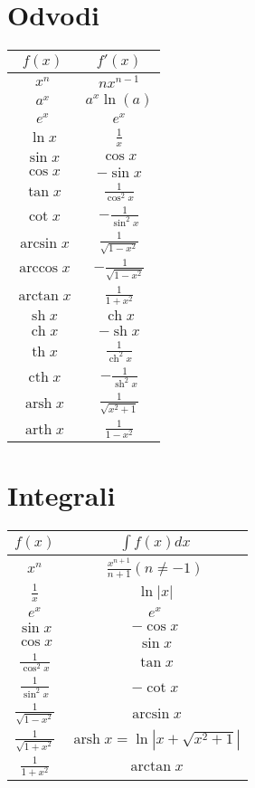 \documentclass[a4paper,oneside,10pt]{article}
\title{\Title}
\author{\Author}
\date{\today}
\theoremstyle{definition}
\DeclareMathOperator\ch{ch}
\DeclareMathOperator\sh{sh}
\DeclareMathOperator\Th{th}  %
\DeclareMathOperator\cth{cth}
\DeclareMathOperator\arsh{arsh}
\DeclareMathOperator\arth{arth}
\newcommand\abs[1]{\left|#1\right|}
\begin{document}
\begin{multicols}{2}
	\section*{Odvodi}
	\begin{tabular}[h]{|c|c|}
		\hline
		$f(x)$ & $f'(x)$ \\
		\hline
		$x^n$ & $nx^{n-1}$\\
		$a^x$ & $a^x\ln(a)$\\
		$e^x$ & $e^x$\\
		$\ln{x}$ & $\frac{1}{x}$\\
		$\sin{x}$ & $\cos{x}$\\
		$\cos{x}$ & $-\sin{x}$\\
		$\tan{x}$ & $\frac{1}{\cos^2{x}}$\\
		$\cot{x}$ & $-\frac{1}{\sin^2{x}}$\\
		$\arcsin{x}$ & $\frac{1}{\sqrt{1-x^2}}$\\
		$\arccos{x}$ & $-\frac{1}{\sqrt{1-x^2}}$\\
		$\arctan{x}$ & $\frac{1}{1+x^2}$\\
		$\sh{x}$ & $\ch{x}$\\
		$\ch{x}$ & $-\sh{x}$\\
		$\Th{x}$ & $\frac{1}{\ch^2{x}}$\\
		$\cth{x}$ & $-\frac{1}{\sh^2{x}}$\\
		$\arsh{x}$ & $\frac{1}{\sqrt{x^2+1}}$\\
		$\arth{x}$ & $\frac{1}{1-x^2}$\\
		\hline 

	\end{tabular}
%
	\section*{Integrali}
	\begin{tabular}[h]{|c|c|}
		\hline
		$f(x)$ & $\int f(x)dx$ \\
		\hline
		$x^n$ & $\frac{x^{n+1}}{n+1} (n \neq -1)$ \\
		$\frac{1}{x}$ & $\ln{\abs{x}}$ \\
		$e^x$ & $e^x$\\
		$\sin{x}$ & $-\cos{x}$\\
		$\cos{x}$ & $\sin{x}$\\
		$\frac{1}{\cos^2{x}}$ & $\tan{x}$\\
		$\frac{1}{\sin^2{x}}$ & $-\cot{x}$\\
		$\frac{1}{\sqrt{1-x^2}}$ & $\arcsin{x}$\\
		$\frac{1}{\sqrt{1+x^2}}$ & $\arsh{x} = \ln{\abs{x + \sqrt{x^2 + 1}}}$\\
		$\frac{1}{1+x^2}$ & $\arctan{x}$\\


\end{tabular}
\end{multicols}
\end{document}
